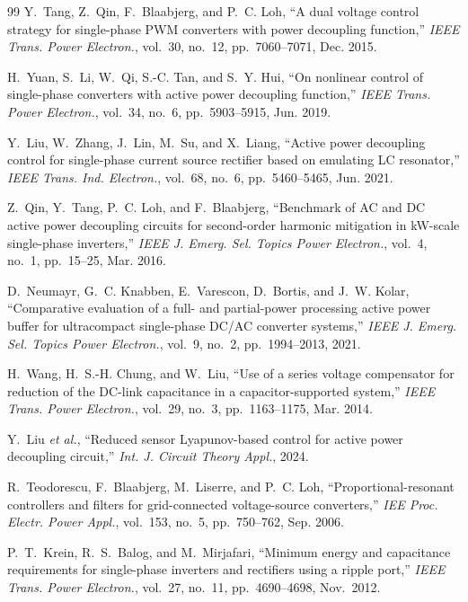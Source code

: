 \begin{thebibliography}{99}
 Y.~Tang, Z.~Qin, F.~Blaabjerg, and P.~C. Loh, ``A dual voltage control strategy for single-phase PWM converters with power decoupling function,'' \emph{IEEE Trans. Power Electron.}, vol.~30, no.~12, pp.~7060--7071, Dec. 2015.

 H.~Yuan, S.~Li, W.~Qi, S.-C. Tan, and S.~Y. Hui, ``On nonlinear control of single-phase converters with active power decoupling function,'' \emph{IEEE Trans. Power Electron.}, vol.~34, no.~6, pp.~5903--5915, Jun. 2019.

 Y.~Liu, W.~Zhang, J.~Lin, M.~Su, and X.~Liang, ``Active power decoupling control for single-phase current source rectifier based on emulating LC resonator,'' \emph{IEEE Trans. Ind. Electron.}, vol.~68, no.~6, pp.~5460--5465, Jun. 2021.

 Z.~Qin, Y.~Tang, P.~C. Loh, and F.~Blaabjerg, ``Benchmark of AC and DC active power decoupling circuits for second-order harmonic mitigation in kW-scale single-phase inverters,'' \emph{IEEE J. Emerg. Sel. Topics Power Electron.}, vol.~4, no.~1, pp.~15--25, Mar. 2016.

 D.~Neumayr, G.~C. Knabben, E.~Varescon, D.~Bortis, and J.~W. Kolar, ``Comparative evaluation of a full- and partial-power processing active power buffer for ultracompact single-phase DC/AC converter systems,'' \emph{IEEE J. Emerg. Sel. Topics Power Electron.}, vol.~9, no.~2, pp.~1994--2013, 2021.

 H.~Wang, H.~S.-H. Chung, and W.~Liu, ``Use of a series voltage compensator for reduction of the DC-link capacitance in a capacitor-supported system,'' \emph{IEEE Trans. Power Electron.}, vol.~29, no.~3, pp.~1163--1175, Mar. 2014.

 Y.~Liu \emph{et al.}, ``Reduced sensor Lyapunov-based control for active power decoupling circuit,'' \emph{Int. J. Circuit Theory Appl.}, 2024.

 R.~Teodorescu, F.~Blaabjerg, M.~Liserre, and P.~C. Loh, ``Proportional-resonant controllers and filters for grid-connected voltage-source converters,'' \emph{IEE Proc. Electr. Power Appl.}, vol.~153, no.~5, pp.~750--762, Sep. 2006.

 P.~T.~Krein, R.~S.~Balog, and M.~Mirjafari, ``Minimum energy and capacitance requirements for single-phase inverters and rectifiers using a ripple port,'' \emph{IEEE Trans. Power Electron.}, vol.~27, no.~11, pp.~4690--4698, Nov.~2012.


\end{thebibliography}
